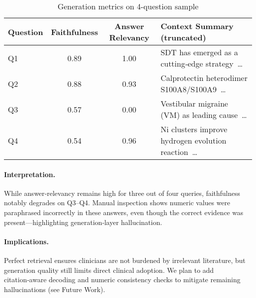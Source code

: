 \documentclass[conference]{IEEEtran}
\begin{document}
\begin{table}[ht]
    \centering
    \caption{Generation metrics on 4-question sample}
    \label{tab:generation}
    \begin{tabularx}{\linewidth}{lccX}
    \toprule
    \textbf{Question} & \textbf{Faithfulness} & \textbf{Answer Relevancy} & \textbf{Context Summary (truncated)} \\
    \midrule
    Q1 & 0.89 & 1.00 & SDT has emerged as a cutting‑edge strategy … \\[2pt]
    Q2 & 0.88 & 0.93 & Calprotectin heterodimer S100A8/S100A9 … \\[2pt]
    Q3 & 0.57 & 0.00 & Vestibular migraine (VM) as leading cause … \\[2pt]
    Q4 & 0.54 & 0.96 & Ni clusters improve hydrogen evolution reaction … \\
    \bottomrule
    \end{tabularx}
\end{table}

\paragraph{Interpretation.}
While answer‑relevancy remains high for three out of four queries, faithfulness notably degrades on Q3–Q4.  
Manual inspection shows numeric values were paraphrased incorrectly in these answers, even though the correct evidence was present—highlighting generation‑layer hallucination.

\paragraph{Implications.}
Perfect retrieval ensures clinicians are not burdened by irrelevant literature, but generation quality still limits direct clinical adoption.  
We plan to add citation‑aware decoding and numeric consistency checks to mitigate remaining hallucinations (see Future Work).




\end{document}
